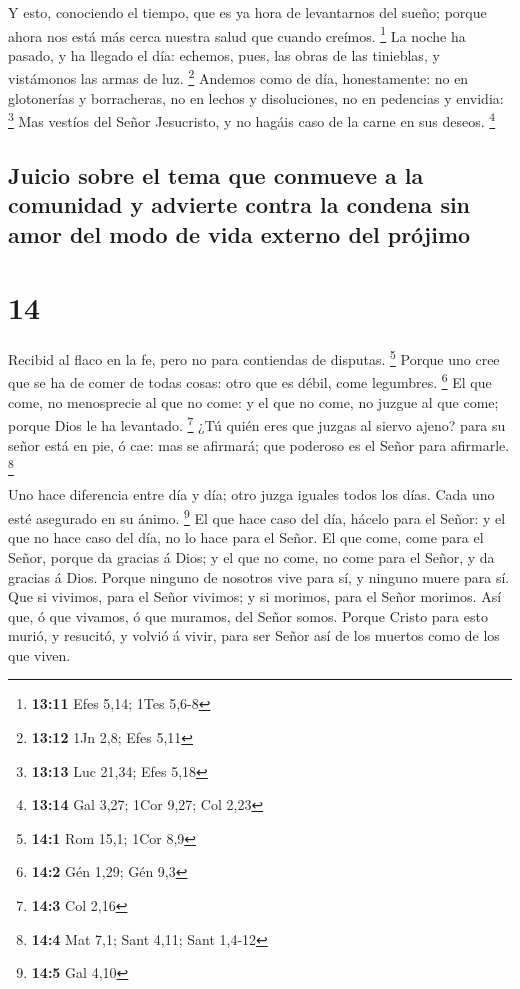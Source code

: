  Y esto, conociendo el tiempo, que es ya hora de
levantarnos del sueño; porque ahora nos está más cerca nuestra salud que
cuando creímos. \footnote{\textbf{13:11} Efes 5,14; 1Tes 5,6-8}
 La noche ha pasado, y ha llegado el día: echemos, pues,
las obras de las tinieblas, y vistámonos las armas de luz. \footnote{\textbf{13:12}
  1Jn 2,8; Efes 5,11}  Andemos como de día, honestamente:
no en glotonerías y borracheras, no en lechos y disoluciones, no en
pedencias y envidia: \footnote{\textbf{13:13} Luc 21,34; Efes 5,18}
 Mas vestíos del Señor Jesucristo, y no hagáis caso de la
carne en sus deseos. \footnote{\textbf{13:14} Gal 3,27; 1Cor 9,27; Col
  2,23}

\hypertarget{juicio-sobre-el-tema-que-conmueve-a-la-comunidad-y-advierte-contra-la-condena-sin-amor-del-modo-de-vida-externo-del-pruxf3jimo}{%
\subsection{Juicio sobre el tema que conmueve a la comunidad y advierte
contra la condena sin amor del modo de vida externo del
prójimo}\label{juicio-sobre-el-tema-que-conmueve-a-la-comunidad-y-advierte-contra-la-condena-sin-amor-del-modo-de-vida-externo-del-pruxf3jimo}}

\hypertarget{section-13}{%
\section{14}\label{section-13}}

 Recibid al flaco en la fe, pero no para contiendas de
disputas. \footnote{\textbf{14:1} Rom 15,1; 1Cor 8,9} 
Porque uno cree que se ha de comer de todas cosas: otro que es débil,
come legumbres. \footnote{\textbf{14:2} Gén 1,29; Gén 9,3}
 El que come, no menosprecie al que no come: y el que no
come, no juzgue al que come; porque Dios le ha levantado. \footnote{\textbf{14:3}
  Col 2,16}  ¿Tú quién eres que juzgas al siervo ajeno?
para su señor está en pie, ó cae: mas se afirmará; que poderoso es el
Señor para afirmarle. \footnote{\textbf{14:4} Mat 7,1; Sant 4,11; Sant
  1,4-12}

 Uno hace diferencia entre día y día; otro juzga iguales
todos los días. Cada uno esté asegurado en su ánimo. \footnote{\textbf{14:5}
  Gal 4,10}  El que hace caso del día, hácelo para el
Señor: y el que no hace caso del día, no lo hace para el Señor. El que
come, come para el Señor, porque da gracias á Dios; y el que no come, no
come para el Señor, y da gracias á Dios.  Porque ninguno
de nosotros vive para sí, y ninguno muere para sí.  Que si
vivimos, para el Señor vivimos; y si morimos, para el Señor morimos. Así
que, ó que vivamos, ó que muramos, del Señor somos. 
Porque Cristo para esto murió, y resucitó, y volvió á vivir, para ser
Señor así de los muertos como de los que viven.

